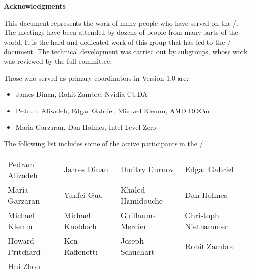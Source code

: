 {\Huge\noindent\textbf{Acknowledgments}}%
{}

\vspace{0.5in}



This document represents the work of many people who have served on
the \MPIHACC/.  The meetings have been attended by dozens of people
from many parts of the world. It is the hard and dedicated work of
this group that has led to the \MEMALLOCDOC/ document. The technical
development was carried out by subgroups, whose work was reviewed by
the full committee.

Those who served as primary coordinators in Version 1.0 are:

\begin{itemize}
\item James Dinan, Rohit Zambre, Nvidia CUDA
\item Pedram Alizadeh, Edgar Gabriel, Michael Klemm, AMD ROCm
\item Maria Garzaran, Dan Holmes, Intel Level Zero
\end{itemize}

The following list includes some of the active participants in
the \MPIHACC/.

\begin{center}
\begin{tabular}{llll}
Pedram Alizadeh &
James Dinan &
Dmitry Durnov &
Edgar Gabriel \\
Maria Garzaran &
Yanfei Guo &
Khaled Hamidouche &
Dan Holmes \\
Michael Klemm &
Michael Knobloch &
Guillaume Mercier &
Christoph Niethammer \\
Howard Pritchard &
Ken Raffenetti &
Joseph Schuchart &
Rohit Zambre \\
Hui Zhou
\end{tabular}
\end{center}

